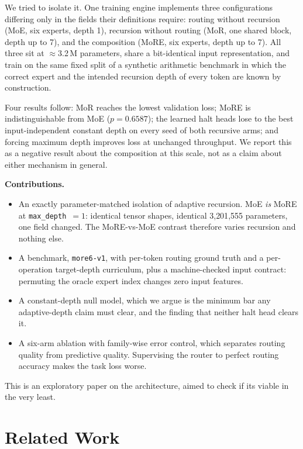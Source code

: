 \documentclass{article}
\begin{document}
We tried to isolate it. One training engine implements three configurations differing
only in the fields their definitions require: routing without recursion (MoE,
six experts, depth 1), recursion without routing (MoR, one shared block, depth
up to 7), and the composition (MoRE, six experts, depth up to 7). All three sit
at $\approx$3.2\,M parameters, share a bit-identical input representation, and
train on the same fixed split of a synthetic arithmetic benchmark in which the
correct expert and the intended recursion depth of every token are known by
construction.

Four results follow: MoR reaches the
lowest validation loss; MoRE is indistinguishable from MoE
($p = 0.6587$); the learned halt heads lose to the best input-independent
constant depth on every seed of both recursive arms; and forcing maximum depth
improves loss at unchanged throughput. We report this as a negative result
about the composition at this scale, not as a claim about either mechanism in
general.

\textbf{Contributions.}
\begin{itemize}[leftmargin=1.4em,itemsep=1pt,topsep=2pt]
\item An exactly parameter-matched isolation of adaptive recursion. MoE
  \emph{is} MoRE at \texttt{max\_depth}~$=1$: identical tensor shapes,
  identical 3{,}201{,}555 parameters, one field changed. The MoRE-vs-MoE
  contrast therefore varies recursion and nothing else.
\item A benchmark, \texttt{more6-v1}, with per-token routing ground truth and
  a per-operation target-depth curriculum, plus a machine-checked input
  contract: permuting the oracle expert index changes zero input features.
\item A constant-depth null model, which we argue is the minimum bar any
  adaptive-depth claim must clear, and the finding that neither halt head
  clears it.
\item A six-arm ablation with family-wise error control, which separates
  routing quality from predictive quality. Supervising the router to perfect
  routing accuracy makes the task loss worse.
\end{itemize}

This is an exploratory paper on the architecture, aimed to check if its viable in the very least.

\section{Related Work}
\end{document}
